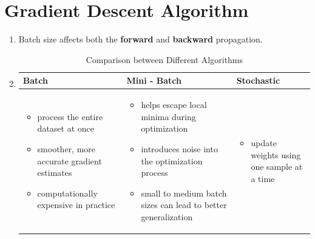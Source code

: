 \documentclass[12pt]{article}
\begin{document}
\section*{Gradient Descent Algorithm}
\begin{enumerate}
    \item Batch size affects both the \textbf{forward} and \textbf{backward} propagation.
    \item \begin{table}[h!]
        \centering
        \scriptsize
        \begin{tabular}{>{\raggedright}p{4cm}| >{\raggedright}p{4cm}| >{\raggedright\arraybackslash}p{4cm}}
        \toprule
        \textbf{Batch}
        & 
        \textbf{Mini - Batch} 
        & 
        \textbf{Stochastic} \\
        \midrule
        
        \begin{itemize}
            \item process the entire dataset at once
            \item smoother, more accurate gradient estimates
            \item computationally expensive in practice
        \end{itemize}
        
        & 
        
        \begin{itemize}
            \item helps escape local minima during optimization
            \item introduces noise into the optimization process 
            \item small to medium batch sizes can lead to better generalization
        \end{itemize}
        
        &
        
        \begin{itemize}
            \item update weights using one sample at a time
        \end{itemize}
        
        \\
        
        \bottomrule
        \end{tabular}
        \caption{Comparison between Different Algorithms}
    \end{table}
\end{enumerate}
\end{document}
